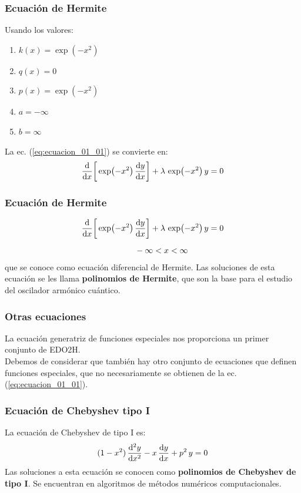 \documentclass[12pt]{beamer}
\begin{document}
\begin{frame}
\frametitle{Ecuación de Hermite}
Usando los valores:
\pause
{}
\begin{multicols}{2}
\begin{enumerate}[<+->]
\item $k(x) = \exp(-x^{2})$
\item $q(x) = 0$
\item $p(x) = \exp(-x^{2})$
\item $a = -\infty$
\item $b = \infty$
\end{enumerate}
\end{multicols}
\pause
La ec. (\ref{eq:ecuacion_01_01}) se convierte en:
\begin{align}
\dv{x} \bigg[ \exp(-x^{2}) \, \dv{y}{x} \bigg] + \lambda \, \exp(-x^{2}) \, y = 0
\label{eq:ecuacion_01_07}
\end{align}
\end{frame}
\begin{frame}
\frametitle{Ecuación de Hermite}
\begin{align*}
\dv{x} \bigg[ \exp(-x^{2}) \, &\dv{y}{x} \bigg] + \lambda \, \exp(-x^{2}) \, y = 0 \\[0.5em]
&- \infty < x < \infty
\end{align*}
\pause
que se conoce como \textcolor{cadet}{ecuación diferencial de Hermite}. \pause Las soluciones de esta ecuación se les llama \textbf{\textcolor{camel}{polinomios de Hermite}}, que son la base para el estudio del oscilador armónico cuántico.
\end{frame}
\begin{frame}
\frametitle{Otras ecuaciones}
La ecuación generatriz de funciones especiales nos proporciona un primer conjunto de EDO2H.
\\
\bigskip
\pause
Debemos de considerar que también hay otro conjunto de ecuaciones que definen funciones especiales, que no necesariamente se obtienen de la ec. (\ref{eq:ecuacion_01_01}).
\end{frame}
\begin{frame}
\frametitle{Ecuación de Chebyshev tipo I}
La ecuación de Chebyshev de tipo I es:
\pause
\begin{align*}
(1 - x^{2}) \, \dv[2]{y}{x} - x \, \dv{y}{x} +  p^{2} \, y = 0
\end{align*}
\pause
Las soluciones a esta ecuación se conocen como \textbf{\textcolor{emerald}{polinomios de Chebyshev de tipo I}}. \pause Se encuentran en algoritmos de métodos numéricos computacionales.
\end{frame}
\end{document}
